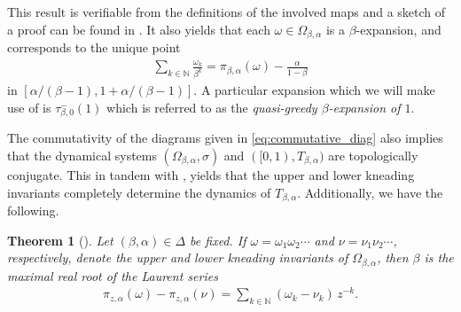 \documentclass[a4paper,reqno,10pt]{amsart}
\newtheorem{theorem}{Theorem}[section]
\begin{document}
This result is verifiable from the definitions of the involved maps and a sketch of a proof can be found in \cite{BHV:2011}.  It also yields that each $\omega \in \Omega_{\beta, \alpha}$ is a $\beta$-expansion, and corresponds to the unique point 
    \begin{align*}
    \sum_{k \in \mathbb{N}} \frac{\omega_{k}}{\beta^{k}} = \pi_{\beta,\alpha}(\omega) - \frac{\alpha}{1-\beta}
    \end{align*}
in $[\alpha/(\beta-1), 1+\alpha/(\beta-1)]$. A particular expansion which we will make use of is $\tau_{\beta,0}^{-}(1)$ which is referred to as the \textsl{quasi-greedy $\beta$-expansion of $1$}.

The commutativity of the diagrams given in \eqref{eq:commutative_diag} also implies that the dynamical systems $(\Omega_{\beta, \alpha}, \sigma)$ and $([0, 1), T_{\beta, \alpha})$ are topologically conjugate.  This in tandem with , yields that the upper and lower kneading invariants completely determine the dynamics of $T_{\beta, \alpha}$. Additionally, we have the following.

    \begin{theorem}[{\cite{GH,BHV:2011}}]\label{thm:Laurent}
        Let $(\beta, \alpha) \in \Delta$ be fixed. If $\omega = \omega_{1}\omega_{2} \cdots $ and $\nu = \nu_{1} \nu_{2} \cdots $, respectively, denote the upper and lower kneading invariants of $\Omega_{\beta, \alpha}$, then $\beta$ is the maximal real root of the Laurent series 
            \begin{align*}
                \pi_{z,\alpha}(\omega) - \pi_{z,\alpha}(\nu)
                = \sum_{k \in \mathbb{N}} (\omega_{k} - \nu_{k})\,z^{-k}.
            \end{align*}
\end{theorem}
\end{document}
